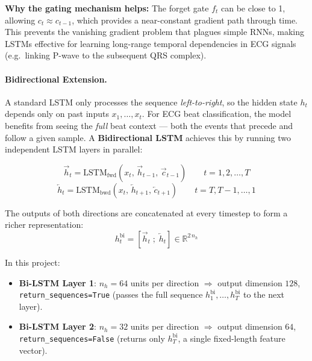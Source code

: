\documentclass[12pt,a4paper]{article}
\begin{document}
\vspace{0.5em}
\noindent\textbf{Why the gating mechanism helps:}
The forget gate $f_t$ can be close to 1, allowing $c_t \approx c_{t-1}$, which
provides a near-constant gradient path through time. This prevents the vanishing
gradient problem that plagues simple RNNs, making LSTMs effective for learning
long-range temporal dependencies in ECG signals (e.g.\ linking P-wave to the
subsequent QRS complex).

\paragraph{Bidirectional Extension.}

A standard LSTM only processes the sequence \emph{left-to-right}, so the hidden
state $h_t$ depends only on past inputs $x_1, \ldots, x_t$.
For ECG beat classification, the model benefits from seeing the \emph{full} beat
context --- both the events that precede and follow a given sample.
A \textbf{Bidirectional LSTM} achieves this by running two independent LSTM
layers in parallel:

\begin{equation}
    \overrightarrow{h}_t = \text{LSTM}_{\text{fwd}}\!\left(x_t,\,
        \overrightarrow{h}_{t-1},\,\overrightarrow{c}_{t-1}\right)
    \qquad t = 1, 2, \ldots, T
\end{equation}
\begin{equation}
    \overleftarrow{h}_t = \text{LSTM}_{\text{bwd}}\!\left(x_t,\,
        \overleftarrow{h}_{t+1},\,\overleftarrow{c}_{t+1}\right)
    \qquad t = T, T{-}1, \ldots, 1
\end{equation}

\noindent The outputs of both directions are concatenated at every timestep to
form a richer representation:
\begin{equation}
    h_t^{\text{bi}} = \left[\overrightarrow{h}_t\;;\;\overleftarrow{h}_t\right]
    \in \mathbb{R}^{2\,n_h}
\end{equation}

\noindent In this project:
\begin{itemize}
    \item \textbf{Bi-LSTM Layer 1}: $n_h = 64$ units per direction
          $\Rightarrow$ output dimension $128$, \texttt{return\_sequences=True}
          (passes the full sequence $h_1^{\text{bi}}, \ldots, h_T^{\text{bi}}$ to
          the next layer).
    \item \textbf{Bi-LSTM Layer 2}: $n_h = 32$ units per direction
          $\Rightarrow$ output dimension $64$, \texttt{return\_sequences=False}
          (returns only $h_T^{\text{bi}}$, a single fixed-length feature vector).
\end{itemize}
\end{document}
